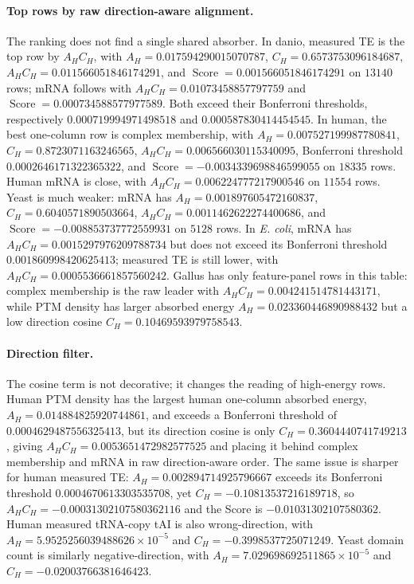 \paragraph{Top rows by raw direction-aware alignment.}
The ranking does not find a single shared absorber.  In danio, measured TE is the top row by $A_HC_H$, with $A_H=0.017594290015070787$, $C_H=0.6573753096184687$, $A_HC_H=0.011566051846174291$, and $\operatorname{Score}=0.001566051846174291$ on $13140$ rows; mRNA follows with $A_HC_H=0.01073458857797759$ and $\operatorname{Score}=0.000734588577977589$.  Both exceed their Bonferroni thresholds, respectively $0.000719994971498518$ and $0.000587830414454545$.  In human, the best one-column row is complex membership, with $A_H=0.007527199987780841$, $C_H=0.8723071163246565$, $A_HC_H=0.006566030115340095$, Bonferroni threshold $0.0002646171322365322$, and $\operatorname{Score}=-0.0034339698846599055$ on $18335$ rows.  Human mRNA is close, with $A_HC_H=0.006224777217900546$ on $11554$ rows.  Yeast is much weaker: mRNA has $A_H=0.001897605472160837$, $C_H=0.6040571890503664$, $A_HC_H=0.0011462622274400686$, and $\operatorname{Score}=-0.008853737772559931$ on $5128$ rows.  In \emph{E. coli}, mRNA has $A_HC_H=0.0015297976209788734$ but does not exceed its Bonferroni threshold $0.001860998420625413$; measured TE is still lower, with $A_HC_H=0.0005536661857560242$.  Gallus has only feature-panel rows in this table: complex membership is the raw leader with $A_HC_H=0.004241514781443171$, while PTM density has larger absorbed energy $A_H=0.023360446890988432$ but a low direction cosine $C_H=0.10469593979758543$.

\paragraph{Direction filter.}
The cosine term is not decorative; it changes the reading of high-energy rows.  Human PTM density has the largest human one-column absorbed energy, $A_H=0.014884825920744861$, and exceeds a Bonferroni threshold of $0.0004629487556325413$, but its direction cosine is only $C_H=0.3604440741749213$, giving $A_HC_H=0.0053651472982577525$ and placing it behind complex membership and mRNA in raw direction-aware order.  The same issue is sharper for human measured TE: $A_H=0.002894714925796667$ exceeds its Bonferroni threshold $0.0004670613303535708$, yet $C_H=-0.10813537216189718$, so $A_HC_H=-0.00031302107580362116$ and the Score is $-0.01031302107580362$.  Human measured tRNA-copy tAI is also wrong-direction, with $A_H=5.9525256039488626\times 10^{-5}$ and $C_H=-0.3998537725071249$.  Yeast domain count is similarly negative-direction, with $A_H=7.029698692511865\times 10^{-5}$ and $C_H=-0.02003766381646423$.

